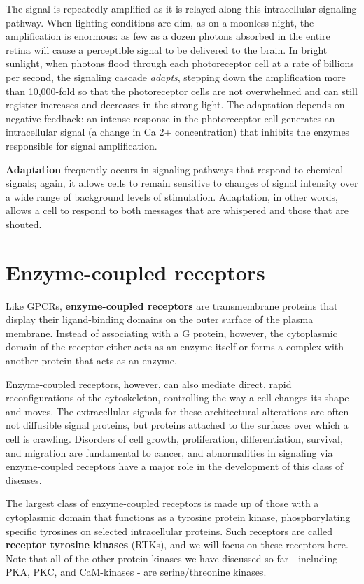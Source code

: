 The signal is repeatedly amplified as it is relayed along this intracellular
signaling pathway. When lighting conditions are dim, as
on a moonless night, the amplification is enormous: as few as a dozen
photons absorbed in the entire retina will cause a perceptible signal to
be delivered to the brain. In bright sunlight, when photons flood through
each photoreceptor cell at a rate of billions per second, the signaling
cascade \textit{adapts}, stepping down the amplification more than 10,000-fold
so that the photoreceptor cells are not overwhelmed and can still register
increases and decreases in the strong light. The adaptation depends on
negative feedback: an intense response in the photoreceptor cell generates 
an intracellular signal (a change in Ca 2+ concentration) that inhibits
the enzymes responsible for signal amplification.

\textbf{Adaptation} frequently occurs in signaling pathways that respond to
chemical signals; again, it allows cells to remain sensitive to changes of
signal intensity over a wide range of background levels of stimulation.
Adaptation, in other words, allows a cell to respond to both messages
that are whispered and those that are shouted.

\section{Enzyme-coupled receptors}

Like GPCRs, \textbf{enzyme-coupled receptors} are transmembrane proteins
that display their ligand-binding domains on the outer surface of the
plasma membrane. Instead of associating with a G protein, however, the
cytoplasmic domain of the receptor either acts as an enzyme itself or
forms a complex with another protein that acts as an enzyme.

Enzyme-coupled receptors, however, can also mediate direct, rapid
reconfigurations of the cytoskeleton, controlling the way a cell changes
its shape and moves. The extracellular signals for these architectural
alterations are often not diffusible signal proteins, but proteins attached
to the surfaces over which a cell is crawling. Disorders of cell growth,
proliferation, differentiation, survival, and migration are fundamental
to cancer, and abnormalities in signaling via enzyme-coupled receptors
have a major role in the development of this class of diseases.

The largest class of enzyme-coupled receptors is made up of those with
a cytoplasmic domain that functions as a tyrosine protein kinase, phosphorylating 
specific tyrosines on selected intracellular proteins. Such
receptors are called \textbf{receptor tyrosine kinases} (RTKs), and we will focus
on these receptors here. Note that all of the other protein kinases we
have discussed so far - including PKA, PKC, and CaM-kinases - are serine/threonine kinases.

